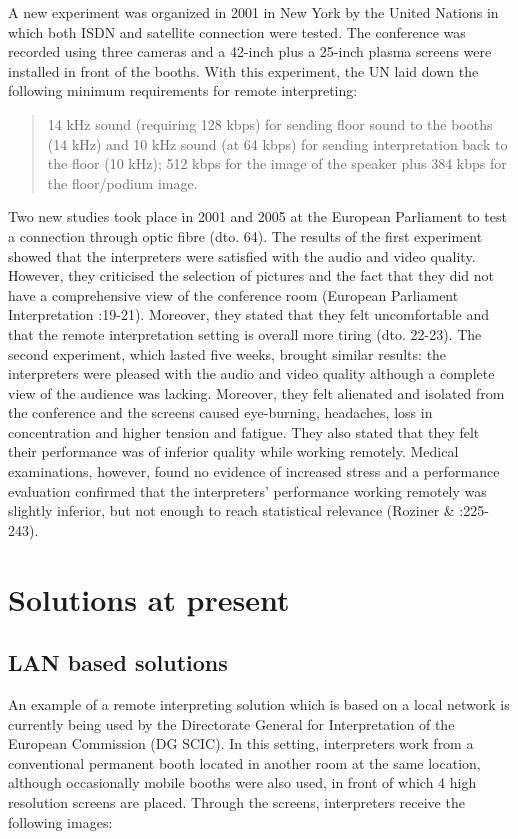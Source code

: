 \documentclass[output=paper]{langsci/langscibook}
\begin{document}
A new experiment was organized in 2001 in New York by the United Nations in which both ISDN and satellite connection were tested. The conference was recorded using three cameras and a 42-inch plus a 25-inch plasma screens were installed in front of the booths. With this experiment, the UN laid down the following minimum requirements for remote interpreting:

\begin{quote}
14 kHz sound (requiring 128 kbps) for sending floor sound to the booths (14 kHz) and 10 kHz sound (at 64 kbps) for sending interpretation back to the floor (10 kHz); 512 kbps for the image of the speaker plus 384 kbps for the floor/podium image.\citep[63]{Mouzourakis2006}
\end{quote}

Two new studies took place in 2001 and 2005 at the European Parliament to test a connection through optic fibre (dto. 64). The results of the first experiment showed that the interpreters were satisfied with the audio and video quality. However, they criticised the selection of pictures and the fact that they did not have a comprehensive view of the conference room (European Parliament Interpretation \citealt{Directorate2001}:19-21). Moreover, they stated that they felt uncomfortable and that the remote interpretation setting is overall more tiring (dto. 22-23). The second experiment, which lasted five weeks, brought similar results: the interpreters were pleased with the audio and video quality although a complete view of the audience was lacking. Moreover, they felt alienated and isolated from the conference and the screens caused eye-burning, headaches, loss in concentration and higher tension and fatigue. They also stated that they felt their performance was of inferior quality while working remotely. Medical examinations, however, found no evidence of increased stress and a performance evaluation confirmed that the interpreters’ performance working remotely was slightly inferior, but not enough to reach statistical relevance (Roziner \& \citealt{Shlesinger2010}:225-243).

\section{Solutions at present}
\subsection{LAN based solutions} 

An example of a remote interpreting solution which is based on a local network is currently being used by the Directorate General for Interpretation of the European Commission (DG SCIC). In this setting, interpreters work from a conventional permanent booth located in another room at the same location, although occasionally mobile booths were also used, in front of which 4 high resolution screens are placed. Through the screens, interpreters receive the following images:
\end{document}

